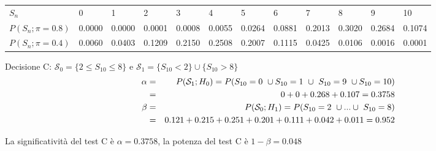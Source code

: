 \documentclass[
  11pt,
]{book}
\theoremstyle{mytheoremstyle}
\theoremstyle{mydefstyle}
\begin{document}
\scriptsize
\begin{table}
\centering\begingroup\fontsize{10}{12}\selectfont

\begin{tabular}{l>{}l>{}l>{}l>{}l>{}l>{}l>{}l>{}l>{}l>{}l>{}l}
\toprule
$S_n$ & \textcolor[HTML]{AB292E}{0} & \textcolor[HTML]{AB292E}{1} & \textcolor[HTML]{012D50}{2} & \textcolor[HTML]{012D50}{3} & \textcolor[HTML]{012D50}{4} & \textcolor[HTML]{012D50}{5} & \textcolor[HTML]{012D50}{6} & \textcolor[HTML]{012D50}{7} & \textcolor[HTML]{012D50}{8} & \textcolor[HTML]{AB292E}{9} & \textcolor[HTML]{AB292E}{10}\\
$P(S_n;\pi=0.8)$ & \textcolor[HTML]{AB292E}{0.0000} & \textcolor[HTML]{AB292E}{0.0000} & \textcolor[HTML]{012D50}{0.0001} & \textcolor[HTML]{012D50}{0.0008} & \textcolor[HTML]{012D50}{0.0055} & \textcolor[HTML]{012D50}{0.0264} & \textcolor[HTML]{012D50}{0.0881} & \textcolor[HTML]{012D50}{0.2013} & \textcolor[HTML]{012D50}{0.3020} & \textcolor[HTML]{AB292E}{0.2684} & \textcolor[HTML]{AB292E}{0.1074}\\
$P(S_n;\pi=0.4)$ & \textcolor[HTML]{AB292E}{0.0060} & \textcolor[HTML]{AB292E}{0.0403} & \textcolor[HTML]{012D50}{0.1209} & \textcolor[HTML]{012D50}{0.2150} & \textcolor[HTML]{012D50}{0.2508} & \textcolor[HTML]{012D50}{0.2007} & \textcolor[HTML]{012D50}{0.1115} & \textcolor[HTML]{012D50}{0.0425} & \textcolor[HTML]{012D50}{0.0106} & \textcolor[HTML]{AB292E}{0.0016} & \textcolor[HTML]{AB292E}{0.0001}\\
\bottomrule
\end{tabular}
\endgroup{}
\end{table}
\normalsize

Decisione C: \(\mathcal{S}_0=\{2\leq S_{10}\leq 8\}\) e \(\mathcal{S}_1=\{S_{10}< 2\}\cup\{S_{10}>8\}\)
\begin{eqnarray*}
\small\alpha &=&P(\mathcal{S}_{1};H_0)=P(S_{10}= 0~\cup S_{10}=1~\cup~ S_{10}=9~\cup S_{10}=10)\\
                    &=&0+0+0.268+0.107=0.3758\\
 \beta       &=& P(\mathcal{S}_{0};H_1)=P(S_{10}=2~\cup ...\cup~ S_{10}=8)\\
             &=&0.121+0.215+0.251+0.201+0.111+0.042+0.011=0.952
\end{eqnarray*}

La significatività del test C è \(\alpha=0.3758\),
la potenza del test C è \(1-\beta=0.048\)
\end{document}
